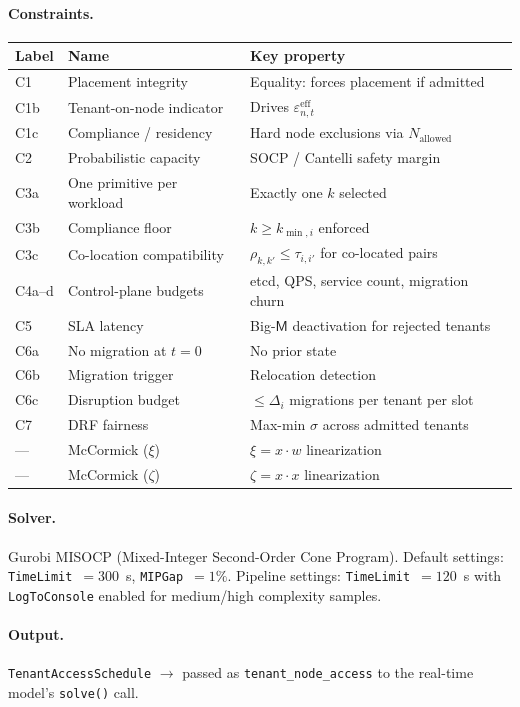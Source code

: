 \documentclass[11pt,a4paper]{article}
\newcommand{\eps}{\varepsilon}          %
\newcommand{\BigM}{\mathsf{M}}          %
\begin{document}
\paragraph{Constraints.}
\begin{center}
\begin{tabular}{@{}lll@{}}
  \toprule
  Label & Name & Key property \\
  \midrule
  C1    & Placement integrity     & Equality: forces placement if admitted \\
  C1b   & Tenant-on-node indicator & Drives $\eps_{n,t}^{\text{eff}}$ \\
  C1c   & Compliance / residency  & Hard node exclusions via $N_{\text{allowed}}$ \\
  C2    & Probabilistic capacity  & SOCP / Cantelli safety margin \\
  C3a   & One primitive per workload & Exactly one $k$ selected \\
  C3b   & Compliance floor        & $k \ge k_{\min,i}$ enforced \\
  C3c   & Co-location compatibility & $\rho_{k,k'} \le \tau_{i,i'}$ for co-located pairs \\
  C4a--d & Control-plane budgets  & etcd, QPS, service count, migration churn \\
  C5    & SLA latency             & Big-$\BigM$ deactivation for rejected tenants \\
  C6a   & No migration at $t=0$   & No prior state \\
  C6b   & Migration trigger       & Relocation detection \\
  C6c   & Disruption budget       & $\le\Delta_i$ migrations per tenant per slot \\
  C7    & DRF fairness            & Max-min $\sigma$ across admitted tenants \\
  \midrule
  ---   & McCormick ($\xi$)       & $\xi = x\cdot w$ linearization \\
  ---   & McCormick ($\zeta$)     & $\zeta = x\cdot x$ linearization \\
  \bottomrule
\end{tabular}
\end{center}

\paragraph{Solver.}
Gurobi MISOCP (Mixed-Integer Second-Order Cone Program).
Default settings: \texttt{TimeLimit}~$=300$~s, \texttt{MIPGap}~$=1\%$.
Pipeline settings: \texttt{TimeLimit}~$=120$~s with \texttt{LogToConsole}
enabled for medium/high complexity samples.

\paragraph{Output.}
\texttt{TenantAccessSchedule} $\to$ passed as
\texttt{tenant\_node\_access} to the real-time model's \texttt{solve()} call.

\bigskip
\end{document}
